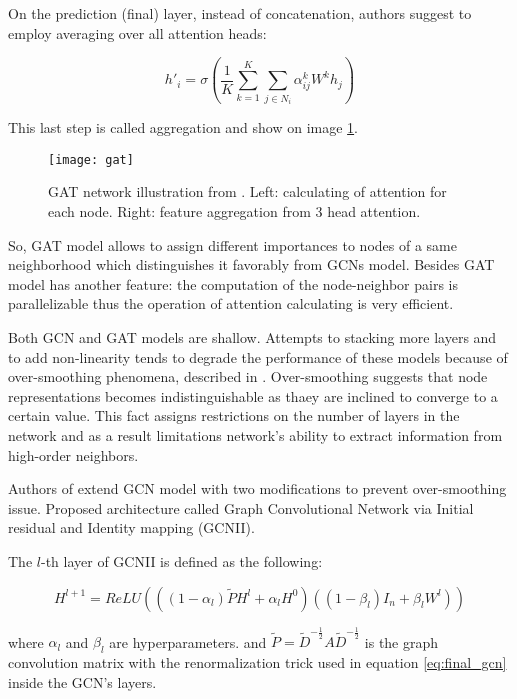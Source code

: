 On the prediction (final) layer, instead of concatenation, authors suggest to employ averaging over all attention heads:

\begin{equation}
    h'_i =  \sigma \left( \frac{1}{K} \sum_{k=1}^{K} \sum_{j \in {N_i}} \alpha^{k}_{ij} W^{k} h_j \right)
    \label{eq:multihead2}
\end{equation}


This last step is called aggregation and show on image \ref{fig:gat}.

\begin{figure}[t]
    \centering
    \texttt{[image: gat]}
    \caption{GAT network illustration from \cite{GAT}. Left: calculating of attention for each node. Right: feature aggregation from 3 head attention.}
    \label{fig:gat}
\end{figure}


So, GAT model allows to assign different importances to nodes of a same neighborhood which distinguishes it favorably from GCNs
model. Besides GAT model has another feature: the computation of the node-neighbor pairs is parallelizable thus the operation
of attention calculating is very efficient.


Both GCN\cite{GCN} and GAT\cite{GAT} models are shallow. Attempts to stacking more layers and to add non-linearity
tends to degrade the performance of these models \cite{GCNII} because of over-smoothing phenomena, described in \cite{OverSmoothing}.
Over-smoothing suggests that node representations becomes indistinguishable as thaey are inclined to converge 
to a certain value. This fact assigns restrictions on the number of layers in the network and as a result
limitations network's ability to extract information from high-order neighbors.


Authors of \cite{GCNII} extend GCN model with two modifications to prevent over-smoothing issue. Proposed architecture 
called Graph Convolutional Network via Initial residual and Identity mapping (GCNII).

The $l$-th layer of GCNII is defined as the following:

\begin{equation}
    H^{l+1} = ReLU\left( ((1-\alpha_{l})\tilde{P}H^{l} + \alpha_{l}H^{0}) ((1-\beta_{l})I_n + \beta_{l} W^{l})  \right)
    \label{eq:gcnii_layer}
\end{equation}

where $\alpha_l$ and $\beta_l$ are hyperparameters.
and $\tilde{P} = \tilde{D}^{-\frac{1}{2}}A\tilde{D}^{-\frac{1}{2}}$ is the graph 
convolution matrix with the renormalization trick used in equation \ref{eq:final_gcn} inside the GCN's layers.

